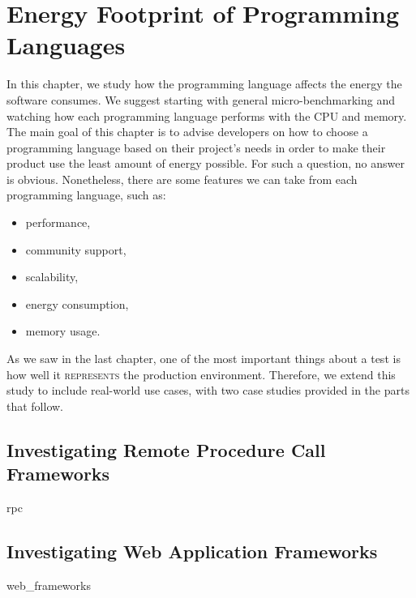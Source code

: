 \chapter{Energy Footprint of Programming Languages}
\label{chapter:porgramming_langauges}
In this chapter, we study how the programming language affects the energy the software consumes.
We suggest starting with general micro-benchmarking and watching how each programming language performs with the CPU and memory.
The main goal of this chapter is to advise developers on how to choose a programming language based on their project's needs in order to make their product use the least amount of energy possible.
For such a question, no answer is obvious.
Nonetheless, there are some features we can take from each programming language, such as:
\begin{itemize}
    \item performance,
    \item community support,
    \item scalability,
    \item energy consumption,
    \item memory usage.
\end{itemize}

As we saw in the last chapter, one of the most important things about a test is how well it \textsc{represents} the production environment.
Therefore, we extend this study to include real-world use cases, with two case studies provided in the parts that follow.

\section{Investigating Remote Procedure Call Frameworks}
{rpc}
\clearpage

\section{Investigating Web Application Frameworks}
{web_frameworks}